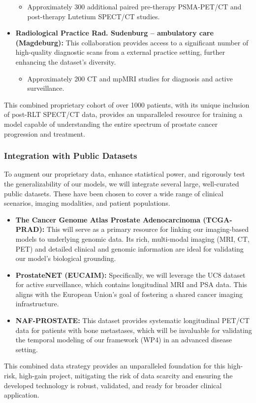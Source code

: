 \documentclass[11pt, a4paper]{article}
\begin{document}
\begin{itemize}
\begin{itemize}
        \item Approximately 300 additional paired pre-therapy PSMA-PET/CT and post-therapy Lutetium SPECT/CT studies.
    \end{itemize}
    \item \textbf{Radiological Practice Rad. Sudenburg – ambulatory care (Magdeburg):} This collaboration provides access to a significant number of high-quality diagnostic scans from a external practice setting, further enhancing the dataset’s diversity.
    \begin{itemize}
        \item Approximately 200 CT and mpMRI studies for diagnosis and active surveillance.
    \end{itemize}
\end{itemize}
This combined proprietary cohort of over 1000 patients, with its unique inclusion of post-RLT SPECT/CT data, provides an unparalleled resource for training a model capable of understanding the entire spectrum of prostate cancer progression and treatment.

\subsubsection{Integration with Public Datasets}
To augment our proprietary data, enhance statistical power, and rigorously test the generalizability of our models, we will integrate several large, well-curated public datasets. These have been chosen to cover a wide range of clinical scenarios, imaging modalities, and patient populations.
\begin{itemize}
    \item \textbf{The Cancer Genome Atlas Prostate Adenocarcinoma (TCGA-PRAD):} This will serve as a primary resource for linking our imaging-based models to underlying genomic data. Its rich, multi-modal imaging (MRI, CT, PET) and detailed clinical and genomic information are ideal for validating our model’s biological grounding.
    \item \textbf{ProstateNET (EUCAIM):} Specifically, we will leverage the UC8 dataset for active surveillance, which contains longitudinal MRI and PSA data. This aligns with the European Union’s goal of fostering a shared cancer imaging infrastructure.
    \item \textbf{NAF-PROSTATE:} This dataset provides systematic longitudinal PET/CT data for patients with bone metastases, which will be invaluable for validating the temporal modeling of our framework (WP4) in an advanced disease setting.
\end{itemize}
This combined data strategy provides an unparalleled foundation for this high-risk, high-gain project, mitigating the risk of data scarcity and ensuring the developed technology is robust, validated, and ready for broader clinical application.
\end{document}
